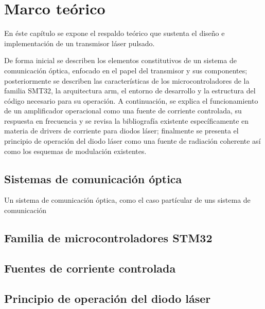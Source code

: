 

\chapter{Marco teórico}

En éste capítulo se expone el respaldo teórico que sustenta el diseño e implementación de un transmisor láser pulsado.

De forma inicial se describen los elementos constitutivos de un sistema de comunicación óptica, enfocado en el papel del transmisor y sus componentes; posteriormente se describen las características de los microcontroladores de la familia SMT32, la arquitectura arm, el entorno de desarrollo y la estructura del código necesario para su operación. A continuación, se explica el funcionamiento de un amplificador operacional como una fuente de corriente controlada, su respuesta en frecuencia y se revisa la bibliografía existente específicamente en materia de drivers de corriente para diodos láser; finalmente se presenta el principio de operación del diodo láser como una fuente de radiación coherente así como los esquemas de modulación existentes.
\section{Sistemas de comunicación óptica}

Un sistema de comunicación óptica, como el caso partícular de uns sistema de comunicación 


\section{Familia de microcontroladores STM32}


\section{Fuentes de corriente controlada}



\section{Principio de operación del diodo láser}
